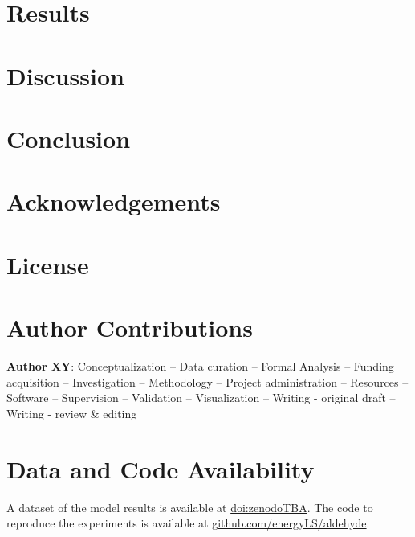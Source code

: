 \documentclass[5p]{elsarticle}
\begin{document}
\section{Results}
\label{sec:results}



\section{Discussion}
\label{sec:discussion}



\section{Conclusion}
\label{sec:conclusion}



\section*{Acknowledgements}


\section*{License}

\section*{Author Contributions}


\textbf{Author XY}:
Conceptualization --
Data curation --
Formal Analysis --
Funding acquisition --
Investigation --
Methodology --
Project administration --
Resources --
Software --
Supervision --
Validation --
Visualization --
Writing - original draft --
Writing - review \& editing


\section*{Data and Code Availability}

A dataset of the model results is available at \href{zenodoTBA}{doi:zenodoTBA}.
The code to reproduce the experiments is available at \href{https://github.com/energyLS/aldehyde}{github.com/energyLS/aldehyde}.
\end{document}
